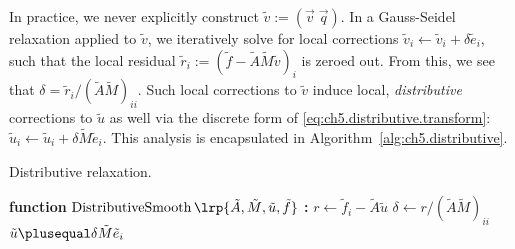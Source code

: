 In practice, we never explicitly construct $\tilde{v} := (\vec{v} \; \vec{q})$. In a Gauss-Seidel relaxation applied to $\tilde{v}$, we iteratively solve for local corrections $\tilde{v}_i \leftarrow \tilde{v}_i + \delta \tilde{e}_i$, such that the local residual $\tilde{r}_i := (\tilde{f} - \tilde{A} \tilde{M} \tilde{v})_i$ is zeroed out. From this, we see that $\delta = \tilde{r}_i / (\tilde{A} \tilde{M})_{ii}$. Such local corrections to $\tilde{v}$ induce local, \emph{distributive} corrections to $\tilde{u}$ as well via the discrete form of \eqref{eq:ch5.distributive.transform}: $\tilde{u}_i \leftarrow \tilde{u}_i + \delta \tilde{M} \tilde{e}_i$. This analysis is encapsulated in Algorithm~\ref{alg:ch5.distributive}.

\begin{algorithm}[htbp]
\caption{Distributive relaxation.}
\label{alg:ch5.distributive}
\begin{algorithmic}[1]
\STATE \textbf{function} $\operatorname{DistributiveSmooth} \lrp{\tilde{A}, \tilde{M}, \tilde{u}, \tilde{f}}$ \textbf{:}
        \STATE $r \leftarrow \tilde{f}_i - \tilde{A} \tilde{u}$
        \STATE $\delta \leftarrow r / (\tilde{A} \tilde{M})_{ii}$
        \STATE $\tilde{u} \plusequal \delta \tilde{M} \tilde{e}_i$
    \ENDFOR
\ENDFOR
\end{algorithmic}
\end{algorithm}

